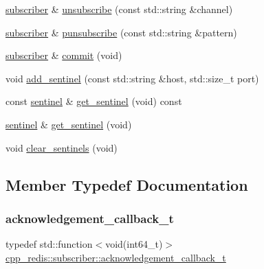 \begin{DoxyCompactItemize}
\item 
\hyperlink{classcpp__redis_1_1subscriber}{subscriber} \& \hyperlink{classcpp__redis_1_1subscriber_a08dffea41cfd5914adfa5a966e0ab292}{unsubscribe} (const std\+::string \&channel)
\item 
\hyperlink{classcpp__redis_1_1subscriber}{subscriber} \& \hyperlink{classcpp__redis_1_1subscriber_a26edc7dcf87ddc8734fac04878ca307a}{punsubscribe} (const std\+::string \&pattern)
\item 
\hyperlink{classcpp__redis_1_1subscriber}{subscriber} \& \hyperlink{classcpp__redis_1_1subscriber_abbf600802ed93b82323185eec5719ecb}{commit} (void)
\item 
void \hyperlink{classcpp__redis_1_1subscriber_a10584e201abe4e701b70d078b3a676fc}{add\+\_\+sentinel} (const std\+::string \&host, std\+::size\+\_\+t port)
\item 
const \hyperlink{classcpp__redis_1_1sentinel}{sentinel} \& \hyperlink{classcpp__redis_1_1subscriber_a55a8906106adceca1faf6ab26e040f8a}{get\+\_\+sentinel} (void) const
\item 
\hyperlink{classcpp__redis_1_1sentinel}{sentinel} \& \hyperlink{classcpp__redis_1_1subscriber_ae883ef7e41753d5c1d819260d7574e4b}{get\+\_\+sentinel} (void)
\item 
void \hyperlink{classcpp__redis_1_1subscriber_ac8f371c14866842cdda7cf1ee5eee2b8}{clear\+\_\+sentinels} (void)
\end{DoxyCompactItemize}


\subsection{Member Typedef Documentation}
\mbox{\label{classcpp__redis_1_1subscriber_a19ea39dfabeb19937a9ce4c8d21781b4}} 
\subsubsection{\texorpdfstring{acknowledgement\+\_\+callback\+\_\+t}{acknowledgement\_callback\_t}}
{\footnotesize\ttfamily typedef std\+::function$<$void(int64\+\_\+t)$>$ \hyperlink{classcpp__redis_1_1subscriber_a19ea39dfabeb19937a9ce4c8d21781b4}{cpp\+\_\+redis\+::subscriber\+::acknowledgement\+\_\+callback\+\_\+t}}

